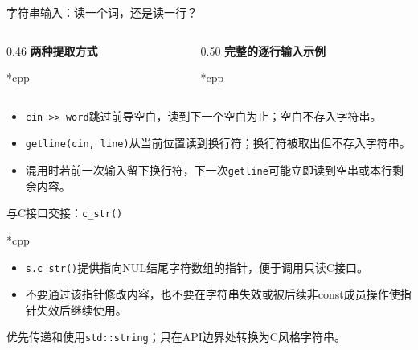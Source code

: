 \begin{frame}{字符串输入：读一个词，还是读一行？}
\begin{columns}[T]
\begin{column}{0.46\textwidth}
\textbf{两种提取方式}
\begin{Code}*{cpp}\end{Code}
\end{column}
\begin{column}{0.50\textwidth}
\textbf{完整的逐行输入示例}
\begin{Code}*{cpp}\end{Code}
\end{column}
\end{columns}
\medskip
\small
\begin{itemize}
\item \texttt{cin >> word}跳过前导空白，读到下一个空白为止；空白不存入字符串。
\item \texttt{getline(cin, line)}从当前位置读到换行符；换行符被取出但不存入字符串。
\item 混用时若前一次输入留下换行符，下一次\texttt{getline}可能立即读到空串或本行剩余内容。
\end{itemize}
\end{frame}

\begin{frame}{与C接口交接：\texttt{c\_str()}}
\begin{Code}*{cpp}\end{Code}
\begin{itemize}
\item \texttt{s.c\_str()}提供指向NUL结尾字符数组的指针，便于调用只读C接口。
\item 不要通过该指针修改内容，也不要在字符串失效或被后续非const成员操作使指针失效后继续使用。
\end{itemize}
\alert{优先传递和使用\texttt{std::string}；只在API边界处转换为C风格字符串。}
\end{frame}
